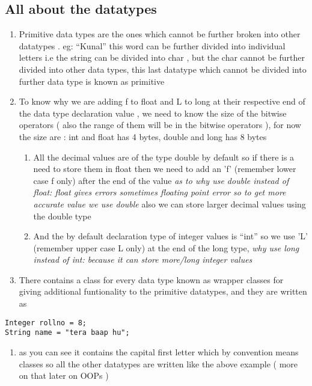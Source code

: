 \documentclass[11pt]{article}
\begin{document}
\subsection{All about the datatypes}
\label{sec:org3008dff}
\begin{enumerate}
\item Primitive data types are the ones which cannot be further broken into other datatypes . eg: ``Kunal'' this word can be further divided into individual letters i.e the string can be divided into char , but the char cannot be further divided into other data types, this last datatype which cannot be divided into further data type is known as primitive
\item To know why we are adding f to float and L to long at their respective end of the data type declaration value , we need to know the size of the bitwise operators ( also the range of them will be in the bitwise operators ),
for now the size are : int and float has 4 bytes, double and long has 8 bytes
\begin{enumerate}
\item All the decimal values are of the type double by default so if there is a need to store them in float then we need to add an 'f' (remember lower case f only) after the end of the value
\emph{as to why use double instead of float: float gives errors sometimes floating point error so to get more accurate value we use double}
also we can  store larger decimal values using the double type
\item And the by default declaration type of integer values is ``int'' so we use 'L' (remember upper case L only) at the end of the long type,
\emph{why use long instead of int: because it can store more/long integer values}
\end{enumerate}
\item There contains a class for every data type known as wrapper classes for giving additional funtionality to the primitive datatypes, and they are written as
\end{enumerate}
\begin{verbatim}
Integer rollno = 8;
String name = "tera baap hu";
\end{verbatim}
\begin{enumerate}
\item as you can see it contains the capital first letter which by convention means classes so all the other datatypes are written like the above example ( more on that later on OOPs )
\end{enumerate}
\end{document}

